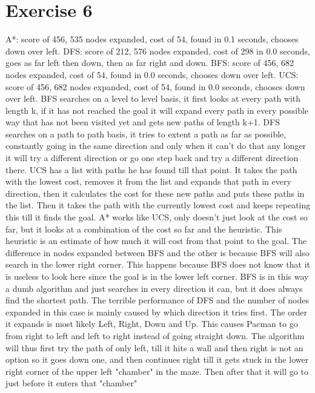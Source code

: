 \section{Exercise 6}
A*:  score of 456, 535 nodes expanded, cost of 54, found in 0.1 seconds, chooses down over left.
DFS: score of 212, 576 nodes expanded, cost of 298 in 0.0 seconds, goes as far left then down, then as far right and down.
BFS: score of 456, 682 nodes expanded, cost of 54, found in 0.0 seconds, chooses down over left. 
UCS: score of 456, 682 nodes expanded, cost of 54, found in 0.0 seconds, chooses down over left. 
BFS searches on a level to level basis, it first looks at every path with length k, if it has not reached the goal 
it will expand every path in every possible way that has not been visited yet and gets new paths of length k+1.
DFS searches on a path to path basis, it tries to extent a path as far as possible, constantly going in the same direction
and only when it can't do that any longer it will try a different direction or go one step back and try a different direction there.
UCS has a list with paths he has found till that point. It takes the path with the lowest cost, removes it from the list 
and expands that path in every direction, then it calculates the cost for these new paths and puts these paths in the list. 
Then it takes the path with the currently lowest cost and keeps repeating this till it finds the goal.
A* works like UCS, only doesn't just look at the cost so far, but it looks at a combination of the cost so far and the heuristic.
This heuristic is an estimate of how much it will cost from that point to the goal.
The difference in nodes expanded between BFS and the other is because BFS will also search in the lower right corner. 
This happens because BFS does not know that it is useless to look here since the goal is in the lower left corner.
BFS is in this way a dumb algorithm and just searches in every direction it can, but it does always find the shortest path.
The terrible performance of DFS and the number of nodes expanded in this case is mainly caused by which direction it tries first. 
The order it expands is most likely Left, Right, Down and Up. This causes Pacman to go from right to left 
and left to right instead of going straight down. The algorithm will thus first try the path of only left, 
till it hits a wall and then right is not an option so it goes down one, and then continues right till it gets stuck in the lower 
right corner of the upper left "chamber" in the maze. Then after that it will go to just before it enters that "chamber" 
